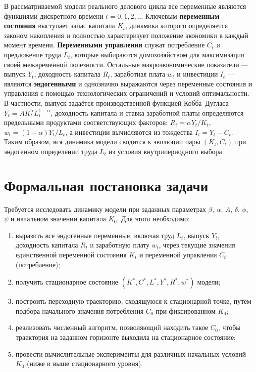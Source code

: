 \documentclass[12pt,a4paper]{report}   %
\begin{document}
            В рассматриваемой модели реального делового цикла все переменные являются функциями дискретного времени $t = 0,1,2,\dots$ Ключевым \textbf{переменным состояния} выступает запас капитала $K_t$, динамика которого определяется законом накопления и полностью характеризует положение экономики в каждый момент времени. \textbf{Переменными управления} служат потребление $C_t$ и предложение труда $L_t$, которые выбираются домохозяйством для максимизации своей межвременной полезности. Остальные макроэкономические показатели — выпуск $Y_t$, доходность капитала $R_t$, заработная плата $w_t$ и инвестиции $I_t$ — являются \textbf{эндогенными} и однозначно выражаются через переменные состояния и управления с помощью технологических ограничений и условий оптимальности. В частности, выпуск задаётся производственной функцией Кобба–Дугласа $Y_t = A K_t^{\alpha} L_t^{1-\alpha}$, доходность капитала и ставка заработной платы определяются предельными продуктами соответствующих факторов: $R_t = \alpha Y_t/K_t$, $w_t = (1-\alpha)Y_t/L_t$, а инвестиции вычисляются из тождества $I_t = Y_t - C_t$. Таким образом, вся динамика модели сводится к эволюции пары $(K_t, C_t)$ при эндогенном определении труда $L_t$ из условия внутрипериодного выбора.

        \section{Формальная постановка задачи}

            Требуется исследовать динамику модели при заданных параметрах $\beta$, $\alpha$, $A$, $\delta$, $\phi$, $\psi$ и начальном значении капитала $K_0$. Для этого необходимо:

            \begin{enumerate}[label=\arabic*)]
                \item выразить все эндогенные переменные, включая труд $L_t$, выпуск $Y_t$, доходность капитала $R_t$ и заработную плату $w_t$, через текущие значения единственной переменной состояния $K_t$ и переменной управления $C_t$ (потребление);
                \item получить стационарное состояние $(K^*, C^*, L^*, Y^*, R^*, w^*)$ модели;
                \item построить переходную траекторию, сходящуюся к стационарной точке, путём подбора начального значения потребления $C_0$ при фиксированном $K_0$;
                \item реализовать численный алгоритм, позволяющий находить такое $C_0$, чтобы траектория на заданном горизонте выходила на стационарное состояние;
                \item провести вычислительные эксперименты для различных начальных условий $K_0$ (ниже и выше стационарного уровня).
            \end{enumerate}
\end{document}
